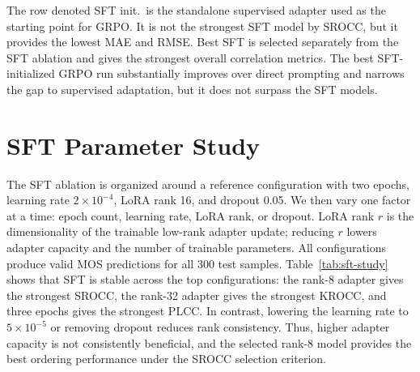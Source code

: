 The row denoted SFT init.\ is the standalone supervised adapter used as the starting point for GRPO. It is not the strongest SFT model by SROCC, but it provides the lowest MAE and RMSE. Best SFT is selected separately from the SFT ablation and gives the strongest overall correlation metrics. The best SFT-initialized GRPO run substantially improves over direct prompting and narrows the gap to supervised adaptation, but it does not surpass the SFT models.

\section{SFT Parameter Study}
The SFT ablation is organized around a reference configuration with two epochs, learning rate $2{\times}10^{-4}$, LoRA rank 16, and dropout 0.05. We then vary one factor at a time: epoch count, learning rate, LoRA rank, or dropout. LoRA rank $r$ is the dimensionality of the trainable low-rank adapter update; reducing $r$ lowers adapter capacity and the number of trainable parameters. All configurations produce valid MOS predictions for all 300 test samples. Table~\ref{tab:sft-study} shows that SFT is stable across the top configurations: the rank-8 adapter gives the strongest SROCC, the rank-32 adapter gives the strongest KROCC, and three epochs gives the strongest PLCC. In contrast, lowering the learning rate to $5{\times}10^{-5}$ or removing dropout reduces rank consistency. Thus, higher adapter capacity is not consistently beneficial, and the selected rank-8 model provides the best ordering performance under the SROCC selection criterion.

